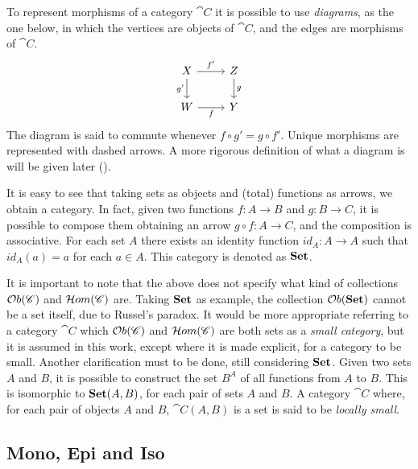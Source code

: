 To represent morphisms of a category $\cat{C}$ it is possible to use \emph{diagrams}, as the one below, in which the vertices are objects of $\cat{C}$, and the edges are morphisms of $\cat{C}$.
    \[
    \begin{tikzcd}
        X \arrow[d, "g'" swap] \arrow[r, "f'"] & Z \arrow[d, "g"] \\
        W \arrow[r, "f" swap] & Y        
    \end{tikzcd}
    \]
The diagram is said to commute whenever  $f \circ g' = g \circ f'$. Unique morphisms are represented with dashed arrows.
A more rigorous definition of what a diagram is will be given later ().

\begin{example}
    It is easy to see that taking sets as objects and (total) functions as arrows, we obtain a category. In fact, given two functions $f: A \rightarrow B$ and $g: B \rightarrow C$, it is possible to compose them obtaining an arrow $g \circ f : A \rightarrow C$, and the composition is associative. For each set $A$ there exists an identity function $id_A: A \rightarrow A$ such that $id_A(a) = a$ for each $a\in A$.
    This category is denoted as $\mathbf{Set}$.
\end{example}

\begin{remark}\label{rem:small_cats}
    It is important to note that the  above does not specify what kind of collections
    $\mathcal{O}b(\mathscr{C})$ and $\mathcal{H}om(\mathscr{C})$ are.
    Taking $\mathbf{Set}$ as example, the collection $\mathcal{O}b(\mathbf{Set})$ cannot be a set itself, due to Russel's paradox. It would be more appropriate referring to a category $\cat{C}$ which $\mathcal{O}b(\mathscr{C})$ and $\mathcal{H}om(\mathscr{C})$ are both sets as a \emph{small category}, but it is assumed in this work, except where it is made explicit, for a category to be small.
    Another clarification must to be done, still considering $\mathbf{Set}$. Given two sets $A$ and $B$, it is possible to construct the set $B^A$ of all functions from $A$ to $B$. This is isomorphic to $\mathbf{Set}(A, B)$, for each pair of sets $A$ and $B$.
    A category $\cat C$ where, for each pair of objects $A$ and $B$, $\cat C (A, B)$ is a set is said to be \emph{locally small}.
\end{remark}

\subsection{Mono, Epi and Iso}\label{ssect:Mono_epi_iso}

